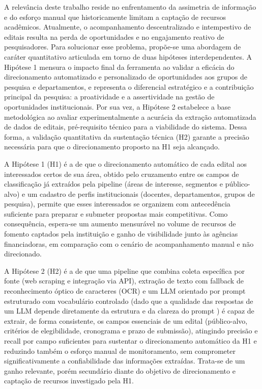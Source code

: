 \documentclass[12pt]{article}
\begin{document}
  A relevância deste trabalho reside no enfrentamento da assimetria de informação e do esforço manual que historicamente limitam a captação de recursos acadêmicos. Atualmente, o acompanhamento descentralizado e intempestivo de editais resulta na perda de oportunidades e no engajamento reativo de pesquisadores. Para solucionar esse problema, propõe-se uma abordagem de caráter quantitativo articulada em torno de duas hipóteses interdependentes. A Hipótese 1 mensura o impacto final da ferramenta ao validar a eficácia do direcionamento automatizado e personalizado de oportunidades aos grupos de pesquisa e departamentos, e representa o diferencial estratégico e a contribuição principal da pesquisa: a proatividade e a assertividade na gestão de oportunidades institucionais. Por sua vez, a Hipótese 2 estabelece a base metodológica ao avaliar experimentalmente a acurácia da extração automatizada de dados de editais, pré-requisito técnico para a viabilidade do sistema. Dessa forma, a validação quantitativa da sustentação técnica (H2) garante a precisão necessária para que o direcionamento proposto na H1 seja alcançado.

  A Hipótese 1 (H1) é a de que o direcionamento automático de cada edital aos interessados certos de sua área, obtido pelo cruzamento entre os campos de classificação já extraídos pela pipeline (áreas de interesse, segmentos e público-alvo) e um cadastro de perfis institucionais (docentes, departamentos, grupos de pesquisa), permite que esses interessados se organizem com antecedência suficiente para preparar e submeter propostas mais competitivas. Como consequência, espera-se um aumento mensurável no volume de recursos de fomento captados pela instituição e ganho de visibilidade junto às agências financiadoras, em comparação com o cenário de acompanhamento manual e não direcionado.

  A Hipótese 2 (H2) é a de que uma pipeline que combina coleta específica por fonte (web scraping e integração via API), extração de texto com fallback de reconhecimento óptico de caracteres (OCR) e um LLM orientado por prompt estruturado com vocabulário controlado (dado que a qualidade das respostas de um LLM depende diretamente da estrutura e da clareza do prompt \cite{b1,b5}) é capaz de extrair, de forma consistente, os campos essenciais de um edital (público-alvo, critérios de elegibilidade, cronograma e prazo de submissão), atingindo precisão e recall por campo suficientes para sustentar o direcionamento automático da H1 e reduzindo também o esforço manual de monitoramento, sem comprometer significativamente a confiabilidade das informações extraídas. Trata-se de um ganho relevante, porém secundário diante do objetivo de direcionamento e captação de recursos investigado pela H1.
\end{document}
